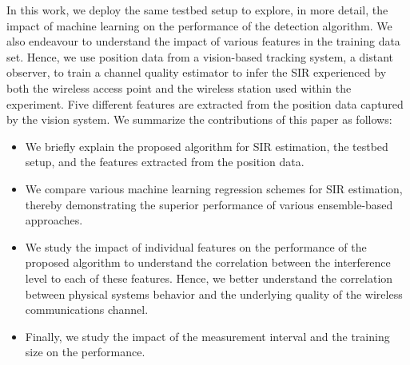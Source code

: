     In this work, we deploy the same testbed setup to explore, in more detail, the impact of machine learning on the performance of the detection algorithm.  We also endeavour to understand the impact of various features in the training data set. Hence, we use position data from a vision-based tracking system, a distant observer, to train a channel quality estimator to infer the SIR experienced by both the wireless access point and the wireless station used within the experiment. Five different features are extracted from the position data captured by the vision system. We summarize the contributions of this paper as follows:
    \begin{itemize}
        \item We briefly explain the proposed algorithm for SIR estimation, the testbed setup, and the features extracted from the position data.
        \item We compare various machine learning regression schemes for SIR estimation, thereby demonstrating the superior performance of various ensemble-based approaches.
        \item We study the impact of individual features on the performance of the proposed algorithm to understand the correlation between the interference level to each of these features. Hence, we better understand the correlation between physical systems behavior and the underlying quality of the wireless communications channel. 
        \item Finally, we study the impact of the measurement interval and the training size on the performance.
    \end{itemize}
    
